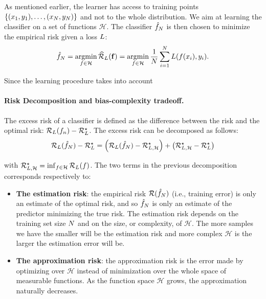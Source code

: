 As mentioned earlier, the learner has access to training points  $\{(x_1,y_1),\dots,(x_N,y_N)\}$ and not to the whole distribution. We aim at learning the classifier on a set of functions $\mathcal{H}$. The classifier $\hat{f}_N $ is then chosen to minimize the empirical risk given a loss $L$:
\begin{align*}
    \hat{f}_N = \operatorname*{argmin}_{f\in\mathcal{H}}\widehat{\mathcal{R}}_{L}(\mathbf{f})= \operatorname*{argmin}_{f\in\mathcal{H}}\frac{1}{N}\sum_{i=1}^N L(f(x_i),y_i).
\end{align*}

Since the learning procedure takes into account 


\paragraph*{Risk Decomposition and bias-complexity tradeoff.} The excess risk of a classifier is defined as the difference between the risk and the optimal risk: $\mathcal{R}_L(f_n) - \mathcal{R}_L^\star$. The excess risk can be decomposed as follows:
\begin{align*}
    \risk_\loss( \hat{f}_\numsamples) - \risk_\loss^\star = \left(\risk_\loss( \hat{f}_\numsamples) - \risk_{\loss,\mathcal{H}}^\star\right)+ \left(\risk_{\loss,\mathcal{H}}^\star - \risk_\loss^\star\right)
\end{align*}

with $\mathcal{R}_{L,\mathcal{H}}^\star = \inf_{f\in\mathcal{H}}\mathcal{R}_L(f)$. The two terms in the previous decomposition corresponds respectively to:
\begin{itemize}
    \item \textbf{The estimation risk}:  the empirical risk $\mathcal{R}(\hat{f}_N)$ (i.e., training error) is only an estimate of the optimal risk, and so $\hat{f}_N$   is only an estimate of the predictor minimizing the true risk. The estimation risk depends on the training set size $N$ and on the size, or complexity, of  $\mathcal{H}$.  The more samples we have the smaller will be the estimation risk and more complex $\mathcal{H}$ is the larger the estimation error will be.
    \item \textbf{The approximation risk}: the approximation risk is the error made by optimizing over $\mathcal{H}$ instead of minimization over the whole space of measurable functions. As  the function space $\mathcal{H}$ grows, the approximation naturally decreases. 
\end{itemize}

